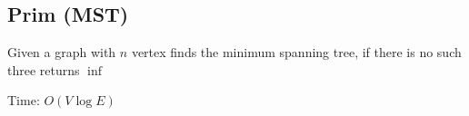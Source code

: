 \subsection{Prim (MST)}

Given a graph with $n$ vertex finds the minimum spanning tree, if there is no such three returns $\inf$

Time: $O(V \log{E})$
